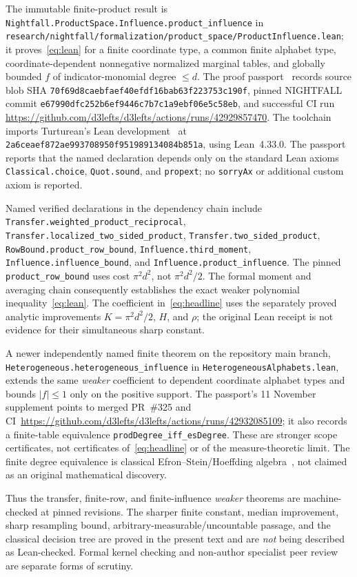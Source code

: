 \documentclass[11pt]{article}
\numberwithin{equation}{section}
\theoremstyle{remark}
\begin{document}
\begin{sloppypar}
The immutable finite-product result is
\texttt{Nightfall.ProductSpace.Influence.product\_influence} in
\texttt{research/nightfall/formalization/product\_space/ProductInfluence.lean}; it proves~\eqref{eq:lean} for a finite coordinate type, a common finite alphabet type, coordinate-dependent nonnegative normalized marginal tables, and globally bounded $f$ of indicator-monomial degree $\le d$. The proof passport~\cite{Passport} records source blob SHA
\texttt{70f69d8caebfaef40efdf16bab63f223753c190f}, pinned NIGHTFALL commit
\texttt{e67990dfc252b6ef9446c7b7c1a9ebf06e5c58eb}, and successful CI run
\url{https://github.com/d3lefts/d3lefts/actions/runs/42929857470}.
The toolchain imports Turturean's Lean development~\cite{Tur26} at
\texttt{2a6ceaef872ae993708950f951989134084b851a}, using Lean~4.33.0. The passport reports that the named declaration depends only on the standard Lean axioms
\texttt{Classical.choice}, \texttt{Quot.sound}, and \texttt{propext}; no \texttt{sorryAx} or additional custom axiom is reported.

Named verified declarations in the dependency chain include
\texttt{Transfer.weighted\_product\_reciprocal},
\texttt{Transfer.localized\_two\_sided\_product},
\texttt{Transfer.two\_sided\_product},
\texttt{RowBound.product\_row\_bound},
\texttt{Influence.third\_moment},
\texttt{Influence.influence\_bound}, and
\texttt{Influence.product\_influence}.
The pinned \texttt{product\_row\_bound} uses cost $\pi^2d^2$, not $\pi^2d^2/2$. The formal moment and averaging chain consequently establishes the exact weaker polynomial inequality~\eqref{eq:lean}. The coefficient in~\eqref{eq:headline} uses the separately proved analytic improvements $K=\pi^2d^2/2$, $H$, and $\rho$; the original Lean receipt is not evidence for their simultaneous sharp constant.

A newer independently named finite theorem on the repository main branch, \texttt{Heterogeneous.heterogeneous\_influence} in \texttt{HeterogeneousAlphabets.lean}, extends the same \emph{weaker} coefficient to dependent coordinate alphabet types and bounds $|f|\le1$ only on the positive support. The passport's 11 November supplement points to merged PR~\#325 and CI~\url{https://github.com/d3lefts/d3lefts/actions/runs/42932085109}; it also records a finite-table equivalence \texttt{prodDegree\_iff\_esDegree}. These are stronger scope certificates, not certificates of~\eqref{eq:headline} or of the measure-theoretic limit. The finite degree equivalence is classical Efron--Stein/Hoeffding algebra~\cite{Hoe48,ES81}, not claimed as an original mathematical discovery.

Thus the transfer, finite-row, and finite-influence \emph{weaker} theorems are machine-checked at pinned revisions. The sharper finite constant, median improvement, sharp resampling bound, arbitrary-measurable/uncountable passage, and the classical decision tree are proved in the present text and are \emph{not} being described as Lean-checked. Formal kernel checking and non-author specialist peer review are separate forms of scrutiny.

\end{sloppypar}
\end{document}
